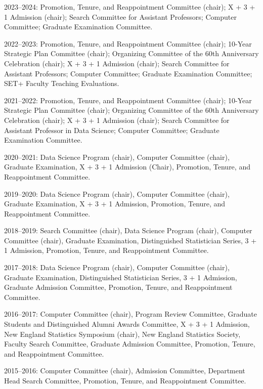 \documentclass[Statistics]{vita}
\begin{document}
\begin{vita}
\begin{Services}
\begin{JournalReviews}
  \end{JournalReviews}
  \begin{DepartmentalService}
  \item 2023--2024: Promotion, Tenure, and Reappointment Committee (chair); X + 3 + 1 Admission (chair); Search Committee for Assistant Professors; Computer Committee; Graduate Examination Committee.
  \item 2022--2023: Promotion, Tenure, and Reappointment Committee (chair); 10-Year Strategic Plan Committee (chair); Organizing Committee of the 60th Anniversary Celebration (chair); X + 3 + 1 Admission (chair); Search Committee for Assistant Professors; Computer Committee; Graduate Examination Committee; SET+ Faculty Teaching Evaluations.
  \item 2021--2022: Promotion, Tenure, and Reappointment Committee (chair); 10-Year Strategic Plan Committee (chair); Organizing Committee of the 60th Anniversary Celebration (chair); X + 3 + 1 Admission (chair); Search Committee for Assistant Professor in Data Science; Computer Committee; Graduate Examination Committee. 
  \item 2020--2021: Data Science Program (chair), Computer Committee (chair), Graduate Examination,  X + 3 + 1 Admission (Chair), Promotion, Tenure, and Reappointment Committee.
  \item 2019--2020: Data Science Program (chair), Computer Committee (chair), Graduate Examination,  X + 3 + 1 Admission, Promotion, Tenure, and Reappointment Committee.
  \item 2018--2019: Search Committee (chair), Data Science Program (chair), Computer Committee (chair), Graduate Examination, Distinguished Statistician Series, 3 + 1 Admission, Promotion, Tenure, and Reappointment Committee.
  \item 2017--2018: Data Science Program (chair), Computer Committee (chair), Graduate Examination, Distinguished Statistician Series, 3 + 1 Admission, Graduate Admission Committee, Promotion, Tenure, and Reappointment Committee.
  \item 2016--2017: Computer Committee (chair), Program Review Committee, Graduate Students and Distinguished Alumni Awards Committee, X + 3 + 1 Admission, New England Statistics Symposium (chair), New England Statistics Society, Faculty Search Committee, Graduate Admission Committee, Promotion, Tenure, and Reappointment Committee.
  \item 2015--2016: Computer Committee (chair), Admission Committee, Department Head Search Committee, Promotion, Tenure, and Reappointment Committee.

\end{DepartmentalService}
\end{Services}
\end{vita}
\end{document}

